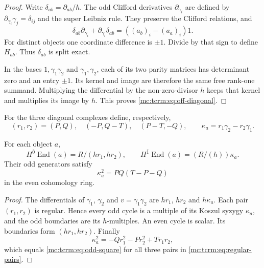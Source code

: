 \begin{proof}
Write $\delta_{ab}=\partial_{ab}/h$.
The odd Clifford derivatives $\partial_{\gamma_i}$
are defined by $\partial_{\gamma_i}\gamma_j=\delta_{ij}$
and the super Leibniz rule. They preserve the Clifford
relations, and
\[
 \delta_{ab}\partial_{\gamma_i}
       +\partial_{\gamma_i}\delta_{ab}
          =((a_b)_i-(a_a)_i)1.
\]
For distinct objects one coordinate difference is
$\pm1$. Divide by that sign to define $H_{ab}$.
Thus $\delta_{ab}$ is split exact.

In the bases $1,\gamma_1\gamma_2$ and
$\gamma_1,\gamma_2$, each of its two parity matrices
has determinant zero and an entry $\pm1$.
Its kernel and image are therefore the same free
rank-one summand. Multiplying the differential by
the non-zero-divisor $h$ keeps that kernel and
multiplies its image by $h$. This proves
\eqref{mc:tcrm:eq:off-diagonal}.
\end{proof}

For the three diagonal complexes define, respectively,
\begin{equation}\label{mc:tcrm:eq:regular-pairs}
 (r_1,r_2)=(P,Q),\quad(-P,Q-T),\quad(P-T,-Q),
 \qquad \kappa_a=r_1\gamma_2-r_2\gamma_1.
\end{equation}

\begin{proposition}\label{mc:tcrm:prop:diagonal}
For each object $a$,
\begin{equation}\label{mc:tcrm:eq:diagonal}
 H^{\bar0}\operatorname{End}(a)=R/(hr_1,hr_2),
 \qquad
 H^{\bar1}\operatorname{End}(a)=(R/(h))\kappa_a.
\end{equation}
Their odd generators satisfy
\begin{equation}\label{mc:tcrm:eq:odd-square}
 \kappa_a^2=PQ(T-P-Q)
\end{equation}
in the even cohomology ring.
\end{proposition}

\begin{proof}
The differentials of $\gamma_1$, $\gamma_2$ and
$v=\gamma_1\gamma_2$ are $hr_1$, $hr_2$ and
$h\kappa_a$. Each pair $(r_1,r_2)$ is regular.
Hence every odd cycle is a multiple of its Koszul
syzygy $\kappa_a$, and the odd boundaries are its
$h$-multiples. An even cycle is scalar. Its boundaries
form $(hr_1,hr_2)$. Finally
\[
 \kappa_a^2=-Qr_1^2-Pr_2^2+Tr_1r_2,
\]
which equals \eqref{mc:tcrm:eq:odd-square} for all three
pairs in \eqref{mc:tcrm:eq:regular-pairs}.
\end{proof}

